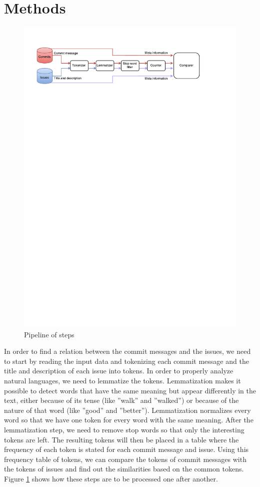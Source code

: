 \section{Methods}
\label{sec:methods}

\begin{figure}[t]
  \centering
  \includegraphics[width=\textwidth,trim={0 24cm 0 0},clip]{images/methods_vis.pdf}
  \caption{Pipeline of steps}
  \label{fig:methods_vis}
\end{figure}

In order to find a relation between the commit messages and the issues, we need to start by reading the input data and tokenizing each commit message and the title and description of each issue into tokens.
In order to properly analyze natural languages, we need to lemmatize the tokens.
Lemmatization makes it possible to detect words that have the same meaning but appear differently in the text, either because of its tense (like ''walk'' and ''walked'') or because of the nature of that word (like ''good'' and ''better'').
Lemmatization normalizes every word so that we have one token for every word with the same meaning.
After the lemmatization step, we need to remove stop words so that only the interesting tokens are left.
The resulting tokens will then be placed in a table where the frequency of each token is stated for each commit message and issue.
Using this frequency table of tokens, we can compare the tokens of commit messages with the tokens of issues and find out the similarities based on the common tokens.
Figure \ref{fig:methods_vis} shows how these steps are to be processed one after another.


